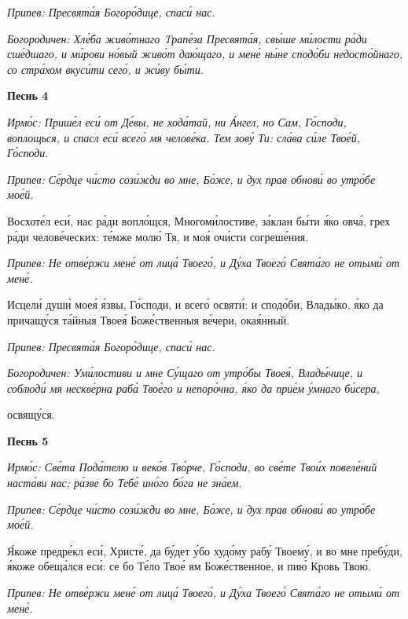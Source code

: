  \itshape Припев:\normalfont{} Пресвята́я Богоро́дице, спаси́ нас.


 \itshape Богородичен:\normalfont{} Хле́ба живо́тнаго Tрапе́за Пресвята́я, свы́ше ми́лости ра́ди
сше́дшаго, и ми́рови но́вый живо́т даю́щаго, и мене́ ны́не сподо́би
недосто́йнаго, со стра́хом вкуси́ти сего́, и жи́ву бы́ти.



 

\bfseries Песнь 4\normalfont{}


 \itshape Ирмо́с:\normalfont{} Прише́л еси́ от Де́вы, не хода́тай, ни А́нгел, но Сам, Го́споди,
воплощься, и спасл еси́ всего́ мя челове́ка. Тем зову́ Ти: сла́ва си́ле Твое́й,
Го́споди.


 \itshape Припев:\normalfont{} Се́рдце чи́сто сози́жди во мне, Бо́же, и дух прав обнови́ во утро́бе
мое́й.


   Восхоте́л еси́, нас ра́ди вопло́щся, Многоми́лостиве, за́клан бы́ти
я́ко овча́, грех ра́ди челове́ческих: те́мже молю́ Тя, и моя́ очи́сти
согреше́ния.


 \itshape Припев:\normalfont{} Не отве́ржи мене́ от лица́ Твоего́, и Ду́ха Твоего́ Свята́го не отыми́ от
мене́.


   Исцели́ души́ моея́ я́звы, Го́споди, и всего́ освяти́: и сподо́би, Влады́ко,
я́ко да причащу́ся та́йныя Твоея́ Боже́ственныя ве́чери, окая́нный.


 \itshape Припев:\normalfont{} Пресвята́я Богоро́дице, спаси́ нас.


 \itshape Богородичен:\normalfont{} Уми́лостиви и мне Су́щаго от утро́бы Твоея́, Влады́чице, и
соблюди́ мя нескве́рна раба́ Твое́го и непоро́чна, я́ко да прие́м у́мнаго би́сера,

освящу́ся.



 

\bfseries Песнь 5\normalfont{}


 \itshape Ирмо́с:\normalfont{} Све́та Пода́телю и веко́в Тво́рче, Го́споди, во све́те Твои́х повеле́ний
наста́ви нас; ра́зве бо Тебе́ ино́го бо́га не зна́ем.


 \itshape Припев:\normalfont{} Се́рдце чи́сто сози́жди во мне, Бо́же, и дух прав обнови́ во утро́бе
мое́й.


   Я́коже предре́кл еси́, Христе́, да бу́дет у́бо худо́му рабу́ Твоему́, и во мне
пребу́ди, я́коже обеща́лся еси́: се бо Те́ло Твое́ ям Боже́ственное, и пию́
Кровь Твою́.


 \itshape Припев:\normalfont{} Не отве́ржи мене́ от лица́ Твоего́, и Ду́ха Твоего́ Свята́го не отыми́ от
мене́.


